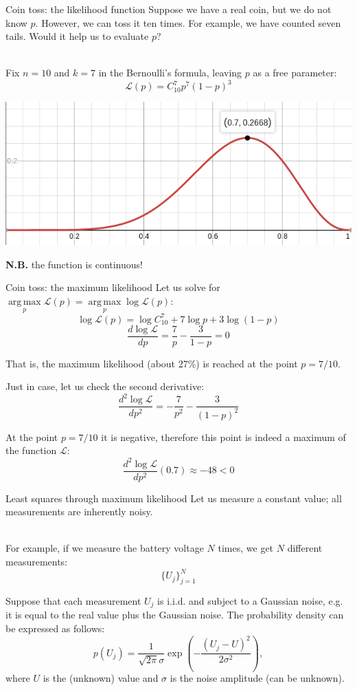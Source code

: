 \documentclass[UKenglish,aspectratio=169]{beamer}
\DeclareMathOperator*{\argmax}{arg\,max}
\begin{document}
\begin{frame}{Coin toss: the likelihood function}
Suppose we have a real coin, but we do not know $p$.
However, we can toss it ten times. For example, we have counted seven tails.
Would it help us to evaluate $p$?

\pause
~\\
Fix $n=10$ and $k=7$ in the Bernoulli's formula, leaving $p$ as a free parameter:
$$\mathcal{L}(p) = C_{10}^7 p^7 (1-p)^3$$

\pause
\begin{center}
\includegraphics[width=.5\columnwidth]{../manuscript/img/likehood-07.png}
\end{center}
\textbf{N.B.} the function is continuous!
\end{frame}

\begin{frame}{Coin toss: the maximum likelihood}
Let us solve for $\argmax\limits_p \mathcal L(p) = \argmax\limits_p \log\mathcal{L}(p)$:
\pause
$$\log \mathcal{L}(p) = \log C_{10}^7 + 7 \log p + 3\log (1-p)$$
\pause
$$\frac{d \log \mathcal{L}}{dp} = \frac{7}{p} - \frac{3}{1-p} = 0$$

\pause
That is, the maximum likelihood (about 27\%) is reached at the point $p=7/10$.

\pause
Just in case, let us check the second derivative:
$$\frac{d^2 \log \mathcal{L}}{dp^2} = -\frac{7}{p^2} - \frac{3}{(1-p)^2}$$

At the point $p=7/10$ it is negative, therefore this point is indeed a maximum of the function $\mathcal{L}$:
$$\frac{d^2 \log \mathcal{L}}{dp^2}(0.7)  \approx -48 < 0$$
\end{frame}

\begin{frame}{Least squares through maximum likelihood}
Let us measure a constant value; all measurements are inherently noisy.

~\\

For example, if we measure the battery voltage $N$ times, we get $N$ different measurements:
$$
\{U_j\}_{j=1}^{N}
$$

Suppose that each measurement $U_j$ is i.i.d. and subject to a Gaussian noise, e.g. it is equal to the real value plus the Gaussian noise.
The probability density can be expressed as follows:
$$
p(U_j) = \frac{1}{\sqrt{2\pi}\sigma} \exp\left(-\frac{(U_j-U)^2}{2\sigma^2}\right),
$$
where $U$ is the (unknown) value and $\sigma$ is the noise amplitude (can be unknown).
\end{frame}
\end{document}
